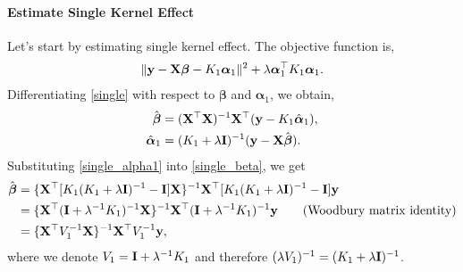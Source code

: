 \documentclass[11pt]{report}
\def\bI{{\bf I}}
\def\bX{{\bf X}}
\def\by{{\bf y}}
\def\bbeta{{\boldsymbol \beta}}
\def\balpha{{\boldsymbol \alpha}}
\begin{document}
\setcounter{equation}{0}
\renewcommand{\theequation}{\arabic{equation}}
\maketitle

\paragraph{Estimate Single Kernel Effect}
Let's start by estimating single kernel effect. The objective function is, 
\begin{align}
\lVert \by-\bX \bbeta -K_1 \balpha_1 \rVert^2 + \lambda \balpha_1^\top K_1 \balpha_1. \label{single}
\end{align}
Differentiating \eqref{single} with respect to $\bbeta$ and $\balpha_1$, we obtain, 
\begin{align}
\hat{\bbeta}&=(\bX^\top \bX)^{-1}\bX^\top (\by-K_1 \hat{\balpha}_1),  \label{single_beta}\\
\hat{\balpha}_1&=(K_1+\lambda \bI)^{-1}(\by-\bX \hat{\bbeta}). \label{single_alpha1}
\end{align}
Substituting \eqref{single_alpha1} into \eqref{single_beta}, we get 
\begin{align}
\hat{\bbeta}&=\{\bX^\top [K_1(K_1+\lambda \bI)^{-1}-\bI]\bX \}^{-1}\bX^\top [K_1(K_1+\lambda \bI)^{-1}-\bI]\by \nonumber \\
&=\{\bX^\top (\bI+\lambda^{-1}K_1)^{-1} \bX \}^{-1}\bX^\top (\bI+\lambda^{-1}K_1)^{-1}\by \tag{Woodbury matrix identity} \\
&=\{\bX^\top V_1^{-1} \bX \}^{-1}\bX^\top V_1^{-1}\by,
\end{align}
where we denote $V_1=\bI+\lambda^{-1}K_1$ and therefore $(\lambda V_1)^{-1}=(K_1+\lambda \bI)^{-1}$.
\end{document}
